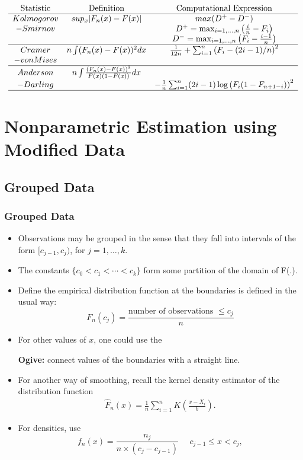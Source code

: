 \documentclass[]{book}
\begin{document}
\[
\begin{matrix}
\begin{array}{ccc}
\text{Statistic} & \text{Definition} & \text{Computational Expression} \\ \hline
Kolmogorov & sup_x |F_n(x) - F(x) |  & max(D^+ - D^-) \\
 -Smirnov &&D^+ = \max_{i=1, \ldots, n} \left(\frac{i}{n} - F_i\right) \\
& &D^- = \max_{i=1, \ldots, n} \left(F_i - \frac{i-1}{n} \right) \\ \hline
Cramer&  n \int (F_n(x) - F(x))^2 dx &
\frac{1}{12n} + \sum_{i=1}^n \left(F_i - (2i-1)/n\right)^2 \\ 
 -von Mises & & \\ \hline
Anderson&  n \int \frac{(F_n(x) - F(x))^2}{F(x)(1-F(x))} dx &\\
  -Darling & &
-\frac{1}{n} \sum_{i=1}^n (2i-1) \log\left(F_i(1-F_{n+1-i})\right)^2 \\ \hline
\end{array}
\end{matrix}
\]

\section{Nonparametric Estimation using Modified
Data}\label{nonparametric-estimation-using-modified-data}

\subsection{Grouped Data}\label{grouped-data}

\subsubsection{Grouped Data}\label{grouped-data-1}

\begin{itemize}
\item
  Observations may be grouped in the sense that they fall into intervals
  of the form \([c_{j-1}, c_j)\), for \(j=1, \ldots, k\).
\item
  The constants \(\{c_0 < c_1 < \cdots < c_k\}\) form some partition of
  the domain of F(.).
\item
  Define the empirical distribution function at the boundaries is
  defined in the usual way:
  \[F_n(c_j) = \frac{\text{number of observations } \le c_j}{n}\]
\item
  For other values of \(x\), one could use the

  \textbf{Ogive:} connect values of the boundaries with a straight line.
\item
  For another way of smoothing, recall the kernel density estimator of
  the distribution function \[\begin{aligned}
   \hat{F}_n(x) = \frac{1}{n} \sum_{i=1}^n K\left(\frac{x-X_i}{b}\right).\end{aligned}\]
\item
  For densities, use
  \[f_n(x) = \frac{n_j}{n \times (c_j - c_{j-1})}  \ \ \ \ \ \ c_{j-1} \le x < c_j,\]
\end{itemize}
\end{document}
